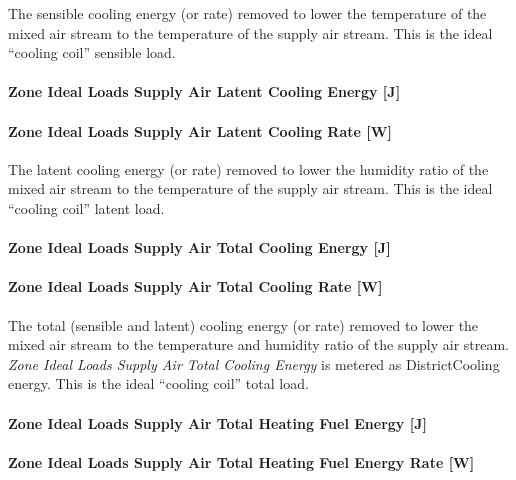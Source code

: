 The sensible cooling energy (or rate) removed to lower the temperature of the mixed air stream to the temperature of the supply air stream. This is the ideal ``cooling coil'' sensible load.

\paragraph{Zone Ideal Loads Supply Air Latent Cooling Energy {[}J{]}}\label{zone-ideal-loads-supply-air-latent-cooling-energy-j}

\paragraph{Zone Ideal Loads Supply Air Latent Cooling Rate {[}W{]}}\label{zone-ideal-loads-supply-air-latent-cooling-rate-w}

The latent cooling energy (or rate) removed to lower the humidity ratio of the mixed air stream to the temperature of the supply air stream. This is the ideal ``cooling coil'' latent load.

\paragraph{Zone Ideal Loads Supply Air Total Cooling Energy {[}J{]}}\label{zone-ideal-loads-supply-air-total-cooling-energy-j}

\paragraph{Zone Ideal Loads Supply Air Total Cooling Rate {[}W{]}}\label{zone-ideal-loads-supply-air-total-cooling-rate-w}

The total (sensible and latent) cooling energy (or rate) removed to lower the mixed air stream to the temperature and humidity ratio of the supply air stream. \emph{Zone Ideal Loads Supply Air Total Cooling Energy} is metered as DistrictCooling energy. This is the ideal ``cooling coil'' total load.

\paragraph{Zone Ideal Loads Supply Air Total Heating Fuel Energy {[}J{]}}\label{zone-ideal-loads-supply-air-total-heating-fuel-energy-j}

\paragraph{Zone Ideal Loads Supply Air Total Heating Fuel Energy Rate {[}W{]}}\label{zone-ideal-loads-supply-air-total-heating-fuel-energy-rate-w}

